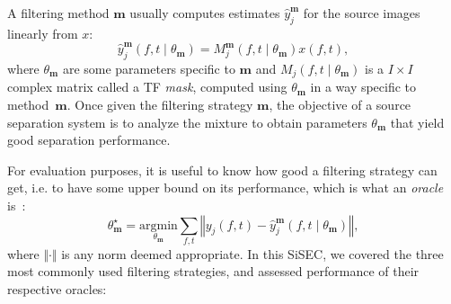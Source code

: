 \documentclass{llncs}
\newcommand{\sboxed}[1]{\textbf{#1}}
\newcommand{\thet}[1]{\theta_{\sboxed{#1}}}
\newcommand{\ft}{\left(f,t\right)}
\newcommand{\ftt}[1]{\left(f,t\mid\thet{#1}\right)}
\begin{document}
A filtering method $\sboxed{m}$ usually computes estimates $\hat{y}_j^{\sboxed{m}}$ for the source images linearly from $x$:
\begin{equation}
  \hat{y}_j^{\sboxed{m}}\ftt{m}=M_j^{\sboxed{m}}\ftt{m} x\ft,\label{eq:TFmask}
\end{equation}
where $\thet{m}$ are some parameters specific to $\sboxed{m}$ and $M_j\ftt{m}$ is a $I\times I$ complex matrix called a TF \textit{mask}, computed using $\thet{m}$ in a way specific to method~$\sboxed{m}$. Once given the filtering strategy $\sboxed{m}$, the objective of a source separation system is to analyze the mixture to obtain parameters $\thet{m}$ that yield good separation performance.

For evaluation purposes, it is useful to know how good a filtering strategy can get, i.e. to have some upper bound on its performance, which is what an \textit{oracle} is~\cite{vincent2007oracle}:
\begin{equation}
  \thet{m}^{\star}=\underset{\thet{m}}{\text{argmin}}\sum_{f,t}\left\Vert y_{j}\ft-\hat{y}_{j}^{\sboxed{m}}\ftt{m}\right\Vert,
  \end{equation}
where $\Vert\cdot\Vert$ is any norm deemed appropriate. In this SiSEC, we covered the three most commonly used filtering strategies, and assessed performance of their respective oracles:
\end{document}

